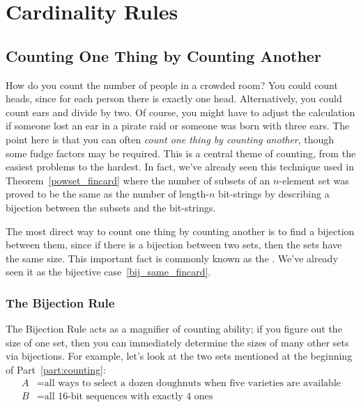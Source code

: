 \chapter{Cardinality Rules}\label{counting_chap}

\newcommand{\Jay}{Ali}
\newcommand{\Jer}{Oscar}

\section{Counting One Thing by Counting Another}\label{bijection_counting_sec}

How do you count the number of people in a crowded room?  You could
count heads, since for each person there is exactly one head.
Alternatively, you could count ears and divide by two.  Of course, you
might have to adjust the calculation if someone lost an ear in a
pirate raid or someone was born with three ears.  The point here is
that you can often \emph{count one thing by counting another}, though
some fudge factors may be required.  This is a central theme of
counting, from the easiest problems to the hardest.  In fact, we've
already seen this technique used in Theorem~\ref{powset_fincard} where
the number of subsets of an $n$-element set was proved to be the same as
the number of length-$n$ bit-strings by describing a bijection
between the subsets and the bit-strings.

The most direct way to count one thing by counting another is to find
a bijection between them, since if there is a bijection between two
sets, then the sets have the same size.  This important fact is
commonly known as the .  We've already seen it as
the  bijective case~\eqref{bij_same_fincard}.

\subsection{The Bijection Rule}

\iffalse
\begin{rul}[Bijection Rule]\label{rul:bijection}
If there is a bijection $f: A \to B$ between $A$ and~$B$, then
$\card{A} = \card{B}$.
\end{rul}
\fi

The Bijection Rule acts as a magnifier of counting ability; if you
figure out the size of one set, then you can immediately determine the
sizes of many other sets via bijections.  For example, let's look at
the two sets mentioned at the beginning of Part~\ref{part:counting}:
%
\begin{align*}
A & = \text{all ways to select a dozen doughnuts when five varieties are available} \\
B & = \text{all 16-bit sequences with exactly 4 ones}
\end{align*}

